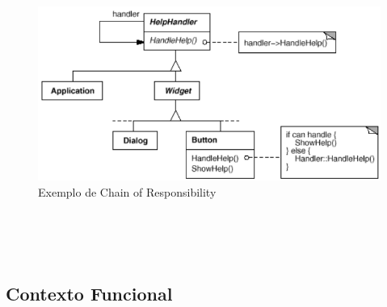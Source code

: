 \begin{figure}[htb]
	\caption{\label{chain_exemplo}Exemplo de Chain of Responsibility}
	\begin{center}
	    \includegraphics[scale=0.5]{5_padroes-contexto-funcional/5.3_comportamentais/5.3.01_chain-of-responsibility/chain-of-responsibility_exemplo.png}
	\end{center}
\end{figure}

\begin{lstlisting}[caption={Chain of Responsibility Orientação a Objetos},label=oochresponsibility]


    
\end{lstlisting}

\subsection*{Contexto Funcional}

\begin{lstlisting}[caption={Chain of Responsibility Funcional},label=fpchresponsibility]
    

    
\end{lstlisting}
